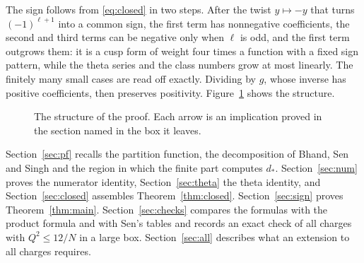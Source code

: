\documentclass[mathematics,article,submit,pdftex,oneauthor]{Definitions/mdpi}
\numberwithin{equation}{section}
\theoremstyle{plain}
\theoremstyle{remark}
\newcommand{\tPhi}{\widetilde{\Phi}}
\begin{document}
The sign follows from \eqref{eq:closed} in two steps. After the twist $y\mapsto -y$ that turns $(-1)^{\ell+1}$ into a common sign, the first term has nonnegative coefficients, the second and third terms can be negative only when $\ell$ is odd, and the first term outgrows them: it is a cusp form of weight four times a function with a fixed sign pattern, while the theta series and the class numbers grow at most linearly. The finitely many small cases are read off exactly. Dividing by $g$, whose inverse has positive coefficients, then preserves positivity. Figure~\ref{fig:map} shows the structure.

\begin{figure}[t]
\centering
{}
\caption{The structure of the proof. Each arrow is an implication proved in the section named in the box it leaves.}
\label{fig:map}
\end{figure}

Section~\ref{sec:pf} recalls the partition function, the decomposition of Bhand, Sen and Singh and the region in which the finite part computes $d_*$. Section~\ref{sec:num} proves the numerator identity, Section~\ref{sec:theta} the theta identity, and Section~\ref{sec:closed} assembles Theorem~\ref{thm:closed}. Section~\ref{sec:sign} proves Theorem~\ref{thm:main}. Section~\ref{sec:checks} compares the formulas with the product formula and with Sen's tables and records an exact check of all charges with $Q^2\le 12/N$ in a large box. Section~\ref{sec:all} describes what an extension to all charges requires.
\end{document}
